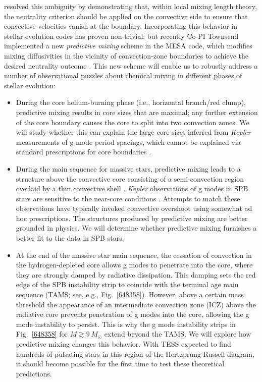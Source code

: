 \citet{Gabriel:2014} resolved this ambiguity by demonstrating that, within local mixing length theory, the neutrality criterion should be applied on the convective side to ensure that convective velocities vanish at the boundary. Incorporating this behavior in stellar evolution codes has proven non-trivial; but recently Co-PI Townsend implemented a new \emph{predictive mixing} scheme in the MESA code, which modifies mixing diffusivities in the vicinity of convection-zone boundaries to achieve the desired neutrality outcome \citep[see][]{Paxton:2017}. This new scheme will enable us to robustly address a number of observational puzzles about chemical mixing in different phases of stellar evolution:
\begin{itemize}
\item During the core helium-burning phase (i.e., horizontal branch/red clump), predictive mixing results in core sizes that are maximal; any further extension of the core boundary causes the core to split into two convection zones. We will study whether this can explain the large core sizes inferred from \emph{Kepler} measurements of g-mode period spacings, which cannot be explained via standard prescriptions for core boundaries \citep[e.g.,][and reference therein]{Constantino:2015}.

\item During the main sequence for massive stars, predictive mixing leads to a structure above the convective core consisting of a semi-convection region overlaid by a thin convective shell \citep[see, e.g., the right-hand panel in Fig.~4 of][]{Paxton:2017}. \emph{Kepler} observations of g modes in SPB stars are sensitive to the near-core conditions \citep[e.g.,][]{Moravveji:2015}.  Attempts to match these observations have typically invoked convective overshoot using somewhat ad hoc prescriptions.    The structures produced by predictive mixing are better grounded in physics. We will determine whether predictive mixing furnishes a better fit to the data in SPB stars.

\item At the end of the massive star main sequence, the cessation of convection in the hydrogen-depleted core allows g modes to penetrate into the core, where they are strongly damped by radiative dissipation. This damping sets the red edge of the SPB instability strip to coincide with the terminal age main sequence (TAMS; see, e.g., Fig.~\ref{648358}). However, above a certain mass threshold the appearance of an intermediate convection zone (ICZ) above the radiative core prevents penetration of g modes into the core, allowing the g mode instability to persist. This is why the g mode instability strips in Fig.~\ref{648358} for $M \! \gtrsim \! 9\,M_{\odot}$ extend beyond the TAMS. We will explore how predictive mixing changes this behavior. With TESS expected to find hundreds of pulsating stars in this region of the Hertzprung-Russell diagram, it should become possible for the first time to test these theoretical predictions.
\end{itemize}